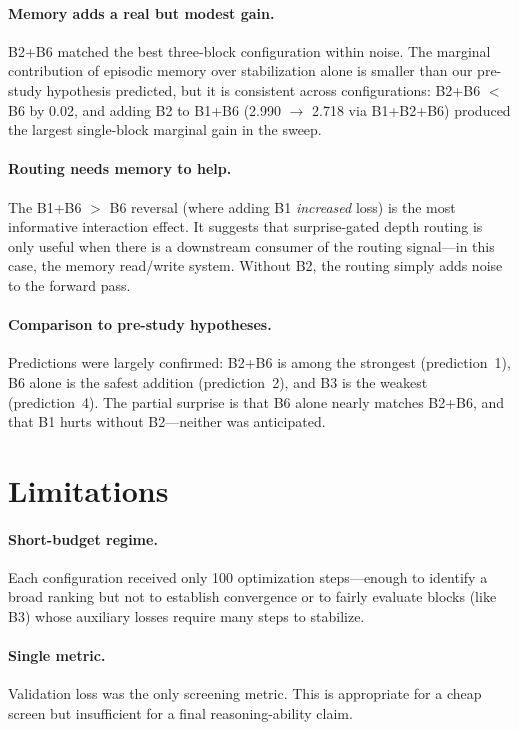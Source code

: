 \documentclass[11pt]{article}
\begin{document}
\paragraph{Memory adds a real but modest gain.}
B2+B6 matched the best three-block configuration within noise.
The marginal contribution of episodic memory over stabilization alone is smaller
than our pre-study hypothesis predicted, but it is consistent across
configurations: B2+B6 $<$ B6 by 0.02, and adding B2 to B1+B6 (2.990
$\to$ 2.718 via B1+B2+B6) produced the largest single-block marginal gain in
the sweep.

\paragraph{Routing needs memory to help.}
The B1+B6 $>$ B6 reversal (where adding B1 \emph{increased} loss) is the most
informative interaction effect.
It suggests that surprise-gated depth routing is only useful when there is a
downstream consumer of the routing signal---in this case, the memory read/write
system.
Without B2, the routing simply adds noise to the forward pass.

\paragraph{Comparison to pre-study hypotheses.}
Predictions were largely confirmed: B2+B6 is among the strongest
(prediction~1), B6 alone is the safest addition (prediction~2), and B3 is the
weakest (prediction~4).
The partial surprise is that B6 alone nearly matches B2+B6, and that B1 hurts
without B2---neither was anticipated.

\section{Limitations}
\label{sec:limitations}

\paragraph{Short-budget regime.}
Each configuration received only 100 optimization steps---enough to identify a
broad ranking but not to establish convergence or to fairly evaluate blocks
(like B3) whose auxiliary losses require many steps to stabilize.

\paragraph{Single metric.}
Validation loss was the only screening metric.
This is appropriate for a cheap screen but insufficient for a final
reasoning-ability claim.
\end{document}
